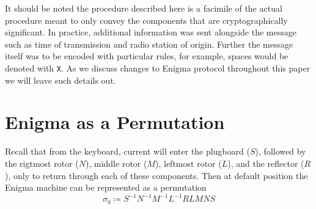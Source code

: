 \noindent It should be noted the procedure described here is a
facimile of the actual procedure meant to only convey the components
that are cryptographically significant. In practice, additional
information was sent alongside the message such as time of
transmission and radio station of origin. Further the message itself
was to be encoded with particular rules, for example, spaces would be
denoted with \texttt{X}. As we discuss changes to Enigma protocol
throughout this paper we will leave such details out.


\section{Enigma as a Permutation}

Recall that from the keyboard, current will enter the plugboard
($S$), followed by the rigtmost rotor ($N$), middle
rotor ($M$), leftmost rotor ($L$), and the reflector ($R$), only to
return through each of these components. Then at default position the
Enigma machine can be represented as a permutation
\[
  \sigma_0 \coloneq S^{-1}N^{-1}M^{-1}L^{-1}RLMNS
\]

